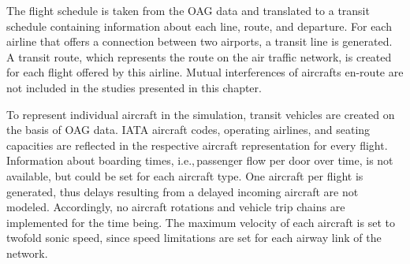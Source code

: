 
The flight schedule is taken from the OAG data and translated to a  transit schedule containing information about each line, route, and departure. 
For each airline that offers a connection between two airports, a transit line is generated. 
A transit route, which represents the route on the air traffic network, is created for each flight offered by this airline. 
Mutual interferences of aircrafts en-route are not included in the studies presented in this chapter.

To represent individual aircraft in the simulation, transit vehicles are created on the basis of OAG data. 
IATA aircraft codes, operating airlines, and seating capacities are reflected in the respective aircraft representation for every flight. 
Information about boarding times, i.e.,\,passenger flow per door over time, is not available, but could be set for each aircraft type. 
One aircraft per flight is generated, thus delays resulting from a delayed incoming aircraft are not modeled.
Accordingly, no aircraft rotations and vehicle trip chains are implemented for the time being. 
The maximum velocity of each aircraft is set to twofold sonic speed, since speed limitations are set for each airway link of the network. 

